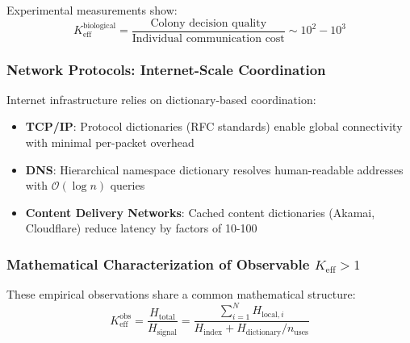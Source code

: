 \documentclass[11pt,a4paper]{article}
\begin{document}
	Experimental measurements show:
	\begin{equation}
		K_{\mathrm{eff}}^{\text{biological}} = \frac{\text{Colony decision quality}}{\text{Individual communication cost}} \sim 10^2 - 10^3
	\end{equation}
	
	\subsubsection{Network Protocols: Internet-Scale Coordination}
	Internet infrastructure relies on dictionary-based coordination:
	\begin{itemize}
		\item \textbf{TCP/IP}: Protocol dictionaries (RFC standards) enable global connectivity with minimal per-packet overhead
		\item \textbf{DNS}: Hierarchical namespace dictionary resolves human-readable addresses with $\mathcal{O}(\log n)$ queries
		\item \textbf{Content Delivery Networks}: Cached content dictionaries (Akamai, Cloudflare) reduce latency by factors of 10-100
	\end{itemize}
	
	\subsubsection{Mathematical Characterization of Observable $K_{\mathrm{eff}} > 1$}
	These empirical observations share a common mathematical structure:
	\begin{equation}
		K_{\mathrm{eff}}^{\text{obs}} = \frac{H_{\text{total}}}{H_{\text{signal}}} = \frac{\sum_{i=1}^N H_{\text{local}, i}}{H_{\text{index}} + H_{\text{dictionary}}/n_{\text{uses}}}
	\end{equation}
	
\end{document}
